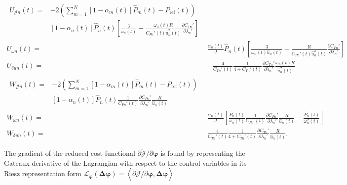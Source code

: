 \begin{align*}
\begin{split}
U_{\mathcal{J}n}(t) =& -2 \left(\sum_{m=1}^N \left[ 1 - \alpha_m(t) \right] \hat{P}_m(t) - P_\text{ref}(t)  \right)  \\
&\left[ 1 - \alpha_n(t) \right] \hat{P}_n(t)  \left[ \frac{3}{\hat{u}_n(t)} - \frac{\omega_n(t) R}{C_{Pn}'(t) \hat{u}_n^2(t)} \frac{\partial C_{Pn}'}{\partial \lambda_n'} \right] 
\end{split}\\
%
U_{\omega n}(t) =& \frac{\alpha_n(t)}{J} \hat{P}_n(t) \left[ \frac{3}{\omega_n(t) \hat{u}_n(t)} -  \frac{R}{C_{Pn}'(t) \hat{u}_n^2(t)} \frac{\partial C_{Pn}'}{\partial \lambda_n'} \right] \\
%
U_{\delta u n}(t) =& - \frac{4}{C_{Tn}'(t)}\frac{1}{4 + C_{Tn}'(t)} \frac{\partial C_{Tn}'}{\partial \lambda_n'} \frac{\omega_n(t) R}{\hat{u}_n^2(t)}\\
%
\begin{split}
W_{\mathcal{J}n}(t) = &-2 \left(\sum_{m=1}^N \left[ 1 - \alpha_m(t) \right] \hat{P}_m(t) - P_\text{ref}(t)  \right) \\
 & \left[ 1 - \alpha_n(t) \right] \hat{P}_n(t)\frac{1}{C_{Pn}'(t)} \frac{\partial C_{Pn}'}{\partial \lambda_n'}  \frac{R}{ \hat{u}_n(t)}
\end{split}\\
%
W_{\omega n}(t) =& \frac{\alpha_n(t)}{J} \left[ \frac{\hat{P}_n(t)}{\omega_n(t)} \frac{1}{C_{Pn'}(t)} \frac{\partial C_{Pn}'}{\partial \lambda_n'} \frac{R}{\hat{u}_n(t)} - \frac{\hat{P}_n(t)}{\omega^2_n(t)} \right] \\
%
W_{\delta u n}(t) =&\frac{4}{C_{Tn}'(t)}\frac{1}{4 + C_{Tn}'(t)} \frac{\partial C_{Tn}'}{\partial \lambda_n'} \frac{R}{\hat{u}_n(t)}.
\end{align*}
%

The gradient of the reduced cost functional $\partial \tilde{\mathcal{J}} / \partial \boldsymbol \varphi$ is found by representing the Gateaux derivative of the Lagrangian with respect to the control variables in its Riesz representation form $\mathcal{L}_{\boldsymbol \varphi}(\boldsymbol \Delta {\boldsymbol \varphi}) = \left \langle  \partial \tilde{\mathcal{J}} / \partial \boldsymbol \varphi, \boldsymbol \Delta \boldsymbol \varphi \right\rangle$

